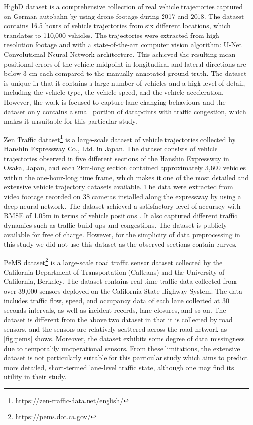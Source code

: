 \documentclass[11pt]{uonthesis}
\begin{document}
HighD dataset \cite{highDdataset} is a comprehensive collection of real vehicle trajectories captured on German autobahn by using drone footage during 2017 and 2018. The dataset contains 16.5 hours of vehicle trajectories from six different locations, which translates to 110,000 vehicles. The trajectories were extracted from high resolution footage and with a state-of-the-art computer vision algorithm: U-Net Convolutional Neural Network architecture. This achieved the resulting mean positional errors of the vehicle midpoint in longitudinal and lateral directions are below 3 cm each compared to the manually annotated ground truth. The dataset is unique in that it contains a large number of vehicles and a high level of detail, including the vehicle type, the vehicle speed, and the vehicle acceleration. However, the work is focused to capture lane-changing behaviours and the dataset only contains a small portion of datapoints with traffic congestion, which makes it unsuitable for this particular study.

Zen Traffic dataset\footnote{https://zen-traffic-data.net/english/} is a large-scale dataset of vehicle trajectories collected by Hanshin Expressway Co., Ltd. in Japan. The dataset consists of vehicle trajectories observed in five different sections of the Hanshin Expressway in Osaka, Japan, and each 2km-long section contained approximately 3,600 vehicles within the one-hour-long time frame, which makes it one of the most detailed and extensive vehicle trajectory datasets available. The data were extracted from video footage recorded on 38 cameras installed along the expressway by using a deep neural network. The dataset achieved a satisfactory level of accuracy with RMSE of 1.05m in terms of vehicle positions \cite{seo2020evaluation}. It also captured different traffic dynamics such as traffic build-ups and congestions. The dataset is publicly available for free of charge. However, for the simplicity of data preprocessing in this study we did not use this dataset as the observed sections contain curves.

PeMS dataset\footnote{https://pems.dot.ca.gov/} is a large-scale road traffic sensor dataset collected by the California Department of Transportation (Caltrans) and the University of California, Berkeley. The dataset contains real-time traffic data collected from over 39,000 sensors deployed on the California State Highway System. The data includes traffic flow, speed, and occupancy data of each lane collected at 30 seconds intervals, as well as incident records, lane closures, and so on. The dataset is different from the above two dataset in that it is collected by road sensors, and the sensors are relatively scattered across the road network as \ref{fig:pems} shows. Moreover, the dataset exhibits some degree of data missingness due to temporalily unoperational sensors. From these limitations, the extensive dataset is not particularly suitable for this particular study which aims to predict more detailed, short-termed lane-level traffic state, although one may find its utility in their study.
\end{document}
